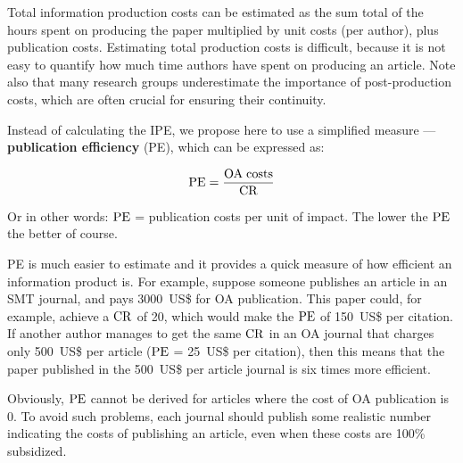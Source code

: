 \documentclass[graybox,envcountchap,sectrefs,UStrade]{svmono}
\begin{document}
Total information production costs can be estimated as the sum total of the hours spent on producing the paper multiplied by unit costs (per author), plus publication costs. Estimating total production costs is difficult, because it is not easy to quantify how much time authors have spent on producing an article. Note also that many research groups underestimate the importance of post-production costs, which are often crucial for ensuring their continuity. \par

Instead of calculating the IPE, we propose here to use a simplified measure --- \textbf{publication efficiency} (PE), which can be expressed as:

\begin{equation}\label{E:info.production}
    {\rm PE} = \frac{{\rm OA} \; {\rm costs}}{{\rm CR}}
\end{equation}

Or in other words: ${\rm PE}$ = publication costs per unit of impact. The lower the ${\rm PE}$ the better of course.\par

PE is much easier to estimate and it provides a quick measure of how efficient an information product is. For example, suppose someone publishes an article in an SMT journal, and pays 3000~US\$ for OA publication. This paper could, for example, achieve a ${\rm CR}$ of 20, which would make the ${\rm PE}$ of 150~US\$ per citation. If another author manages to get the same ${\rm CR}$ in an OA journal that charges only 500~US\$ per article (${\rm PE}$ = 25~US\$ per citation), then this means that the paper published in the 500~US\$ per article journal is six times more efficient.\par

Obviously, ${\rm PE}$ cannot be derived for articles where the cost of OA publication is 0. To avoid such problems, each journal should publish some realistic number indicating the costs of publishing an article, even when these costs are 100\% subsidized.\par
\end{document}
